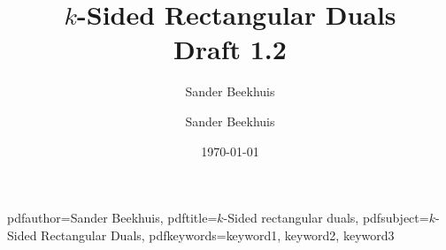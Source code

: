 





\title{$k$-Sided Rectangular Duals \\ \normalsize Draft 1.2}
\author{Sander Beekhuis}
\date{\today} %


%
%
\newcommand{\shortdoctitle}{$k$-Sided rectangular duals}
\newcommand{\doctitle}{$k$-Sided Rectangular Duals}
\newcommand{\docsubtitle}{Some catching subtitle}

\newcommand{\me}{Sander Beekhuis}
\newcommand{\keywords}{keyword1, keyword2, keyword3}
\newcommand{\version}{Version Draft 1.3}
\newcommand{\monthYear}{Feb 2017}

\newcommand{\firstCommitteeMember}{Your First Committee Member}
\newcommand{\secondCommitteeMember}{Your Second Committee Member, usually the daily supervisor}
\newcommand{\thirdCommitteeMember}{Your Third Committee Member, usually the external member}

\author{\me}

%
%
\hypersetup
{
    pdfauthor={\me},
    pdftitle={\shortdoctitle},
    pdfsubject={\doctitle},
    pdfkeywords={\keywords}
}







\normalsize











\newpage
\thispagestyle{plain}

\tableofcontents

\newpage
\thispagestyle{plain}

